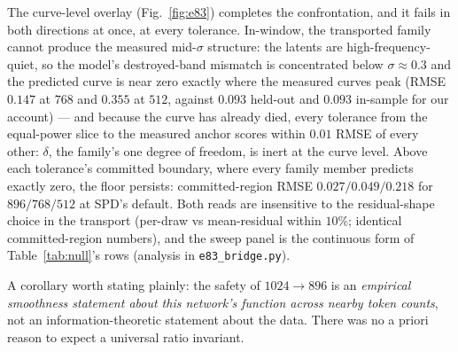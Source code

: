 The curve-level overlay (Fig.~\ref{fig:e83}) completes the
confrontation, and it fails in both directions at once, at every
tolerance. In-window, the transported family cannot produce the
measured mid-$\sigma$ structure: the latents are high-frequency-quiet,
so the model's destroyed-band mismatch is concentrated below
$\sigma \approx 0.3$ and the predicted curve is near zero exactly
where the measured curves peak (RMSE $0.147$ at $768$ and $0.355$ at
$512$, against $0.093$ held-out and $0.093$ in-sample for our
account) --- and because the curve has already died, every tolerance
from the equal-power slice to the measured anchor scores within
$0.01$ RMSE of every other: $\delta$, the family's one degree of
freedom, is inert at the curve level. Above each tolerance's
committed boundary, where every family member predicts exactly zero,
the floor persists: committed-region RMSE $0.027/0.049/0.218$ for
$896/768/512$ at SPD's default. Both reads are insensitive to the
residual-shape choice in the transport (per-draw vs mean-residual
within $10\%$; identical committed-region numbers), and the sweep
panel is the continuous form of Table~\ref{tab:null}'s rows
(analysis in \texttt{e83\_bridge.py}).

A corollary worth stating plainly: the safety of $1024{\to}896$ is an
\emph{empirical smoothness statement about this network's function across
nearby token counts}, not an information-theoretic statement about the
data. There was no a priori reason to expect a universal ratio
invariant.

